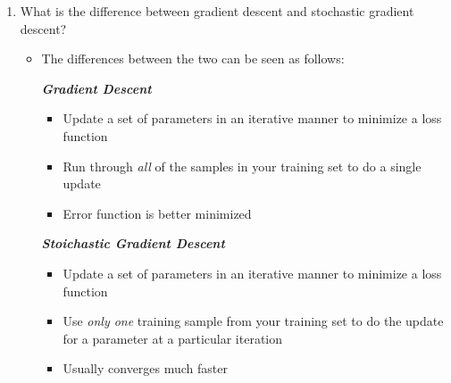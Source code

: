 \documentclass{article}
\begin{document}
\begin{enumerate}
\begin{itemize}
\item {\em Loss Function}: Should penalize mistakes and are minimizing the average loss over the training data
\item The following is a list of common loss functions where {\em Perceptron Loss} is utilized in the Perceptron algorithm, {\em Hinge Loss} is utilized in SVM's, {\em Exponential Loss} is used in AdaBoost, and {\em Logistic Loss} is used in Logistic Regression
\begin{align}
L_{Perceptron}(y,\mathbf{x},\mathbf{w}) &= \max\left[0,-y\mathbf{w}^{T}\mathbf{x}\right]\\
L_{Hinge}(y,\mathbf{x},\mathbf{w}) &= \max\left[0,1-y\mathbf{w}^{T}\mathbf{x}\right]\label{eq:SVM_loss}\\
L_{Exponential}(y,\mathbf{x},\mathbf{w}) &= e^{-y\mathbf{w}^{T}\mathbf{x}}\\
L_{Logistic}(y,\mathbf{x},\mathbf{w}) &= \log\left(1+e^{-y\mathbf{w}^{T}\mathbf{x}}\right)\label{eq:logis_loss}
\intertext{where we can algo generalize our objective function as being}
\min_{h\in H}\text{regularizer}(h)&+C\frac{1}{m}\sum_{i}L\left(h(\mathbf{x}_{i}),f(\mathbf{x}_{i})\right)
\end{align}
\end{itemize}


\item What is the difference between gradient descent and stochastic gradient descent?

\begin{itemize}
\item The differences between the two can be seen as follows:

\begin{center}
\noindent\parbox[t]{.4\textwidth}{\raggedright%
\textbf{\textit{Gradient Descent}}
\begin{itemize}[topsep=0pt,itemsep=-2pt,leftmargin=13pt]
\item Update a set of parameters in an iterative manner to minimize a loss function
\item Run through {\em all} of the samples in your training set to do a single update
\item Error function is better minimized
\end{itemize}
}%
\parbox[t]{.4\textwidth}{\raggedright%
\textbf{\textit{Stoichastic Gradient Descent}}
\begin{itemize}[topsep=0pt,itemsep=-2pt,leftmargin=13pt]
\item Update a set of parameters in an iterative manner to minimize a loss function
\item Use {\em only one} training sample from your training set to do the update for a parameter at a particular iteration
\item Usually converges much faster
\end{itemize}
}
\end{center}
\end{itemize}



\end{enumerate}
\end{document}
